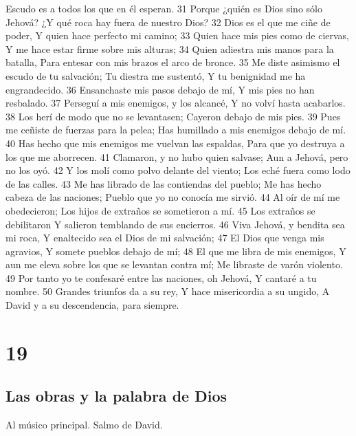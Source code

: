 Escudo es a todos los que en él esperan.
31 Porque ¿quién es Dios sino sólo Jehová?
¿Y qué roca hay fuera de nuestro Dios?
32 Dios es el que me ciñe de poder,
Y quien hace perfecto mi camino;
33 Quien hace mis pies como de ciervas,
Y me hace estar firme sobre mis alturas;
34 Quien adiestra mis manos para la batalla,
Para entesar con mis brazos el arco de bronce.
35 Me diste asimismo el escudo de tu salvación;
Tu diestra me sustentó,
Y tu benignidad me ha engrandecido.
36 Ensanchaste mis pasos debajo de mí,
Y mis pies no han resbalado.
37 Perseguí a mis enemigos, y los alcancé,
Y no volví hasta acabarlos.
38 Los herí de modo que no se levantasen;
Cayeron debajo de mis pies.
39 Pues me ceñiste de fuerzas para la pelea;
Has humillado a mis enemigos debajo de mí.
40 Has hecho que mis enemigos me vuelvan las espaldas,
Para que yo destruya a los que me aborrecen.
41 Clamaron, y no hubo quien salvase;
Aun a Jehová, pero no los oyó.
42 Y los molí como polvo delante del viento;
Los eché fuera como lodo de las calles.
43 Me has librado de las contiendas del pueblo;
Me has hecho cabeza de las naciones;
Pueblo que yo no conocía me sirvió.
44 Al oír de mí me obedecieron;
Los hijos de extraños se sometieron a mí.
45 Los extraños se debilitaron
Y salieron temblando de sus encierros.
46 Viva Jehová, y bendita sea mi roca,
Y enaltecido sea el Dios de mi salvación;
47 El Dios que venga mis agravios,
Y somete pueblos debajo de mí;
48 El que me libra de mis enemigos,
Y aun me eleva sobre los que se levantan contra mí;
Me libraste de varón violento.
49 Por tanto yo te confesaré entre las naciones, oh Jehová,
Y cantaré a tu nombre.
50 Grandes triunfos da a su rey,
Y hace misericordia a su ungido,
A David y a su descendencia, para siempre.

\chapter{19}

\section*{Las obras y la palabra de Dios}

Al músico principal. Salmo de David.

